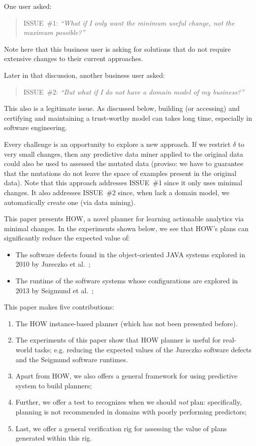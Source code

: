 \documentclass[conference]{IEEEtran}
\newcommand{\bi}{\begin{itemize}}
\newcommand{\ei}{\end{itemize}}
\newcommand{\be}{\begin{enumerate}}
\newcommand{\ee}{\end{enumerate}}
\begin{document}
One  user asked:
\begin{quote}
ISSUE~\#1: {\em ``What if I only want the minimum useful change, not
the maximum possible?''}
\end{quote}
Note here that this business user is asking for solutions  that do not require extensive 
changes to their current  approaches. 

Later in that discussion, another business user asked:
\begin{quote}
ISSUE~\#2: {\em ``But what if I do not have a domain model of my business?''}
\end{quote}
This also is a legitimate issue.
As discussed below,
building (or accessing) and certifying and maintaining a 
trust-worthy model  can  takes  long time, especially in software engineering. 


Every challenge is an opportunity to explore  a new approach.
If we  restrict $\delta$ to very small changes, then any 
predictive data miner applied to the original data could also be used
to assessed the mutated data (proviso: we have to guarantee that
the mutations do not leave the space of examples present in the original data).
Note that this approach addresses ISSUE~\#1 since it only uses minimal changes.
It also addresses  ISSUE~\#2 since, when lack a domain model, we automatically
create one (via data mining).

 
This paper presents HOW, a novel planner for learning actionable analytics via
minimal changes. 
In the experiments shown below, we see that HOW's plans  can significantly
reduce the  expected
value of:
\bi
\item The software defects found in  the object-oriented JAVA systems explored in 2010 by Jureczko et al.~\cite{jureczko10};
\item The runtime of the  software systems whose configurations
are explored in 2013 by Seigmund et al.~\cite{sven12};
\ei
This paper makes five contributions:
\be
\item The HOW  instance-based planner (which has not been presented before).
\item The experiments of this paper show that HOW planner is useful for real-world tasks;
e.g. reducing the
expected values of the Jureczko software defects and the Seigmund software runtimes.
\item Apart from HOW, we  also offers a general framework for using  predictive system to build planners;
\item Further, we offer a  test to recognizes  when we should {\em not}  plan: specifically,
planning is
not recommended in domains with  poorly performing predictors;
\item Last, we  offer a general verification rig for assessing the value of plans generated within this rig.
\ee 
\end{document}
